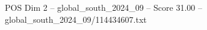\begin{textsample}{POS Dim 2 – global\_south\_2024\_09 – Score 31.00 – global\_south\_2024\_09/114434607.txt}
\end{textsample}
